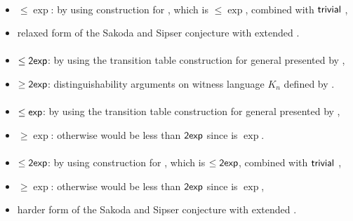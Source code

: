 \paragraph{\TNFA{}\tto\OMODLA}
\begin{itemize}
	\item $\le\exp$: by using construction for \hyperref[cost:2NFAto1DFA]{\TNFA{}\tto\ODFA}, which is $\le\exp$, combined with $\mathsf{trivial}$ \ODFA{}\tto\OMODLA,
	\item relaxed form of the Sakoda and Sipser conjecture with extended \TDFA.
\end{itemize}
\paragraph{\OMOLA{}\tto\ODFA}\label{cost:OM1LAto1DFA}
\begin{itemize}
	\item $\le\mathsf{2exp}$: by using the transition table construction for general \OLA presented by ,
	\item $\ge\mathsf{2exp}$: distinguishability arguments on witness language $K_n$ defined by .
\end{itemize}
\paragraph{\OMOLA{}\tto\ONFA}\label{cost:OM1LAto1NFA}
\begin{itemize}
	\item $\le\mathsf{exp}$: by using the transition table construction for general \OLA presented by ,
	\item $\ge\exp$: otherwise \hyperref[cost:OM1LAto1DFA]{\OMOLA{}\tto\ODFA} would be less than $\mathsf{2exp}$ since \hyperref[cost:1NFAto1DFA]{\ONFA{}\tto\ODFA} is $\exp$.
\end{itemize}
\paragraph{\OMOLA{}\tto\TDFA}
\begin{itemize}
	\item $\le\mathsf{2exp}$: by using construction for \hyperref[cost:OM1LAto1DFA]{\OMOLA{}\tto\ODFA}, which is $\le\mathsf{2exp}$, combined with $\mathsf{trivial}$ \ODFA{}\tto\TDFA,
	\item $\ge\exp$: otherwise \hyperref[cost:OM1LAto1DFA]{\OMOLA{}\tto\ODFA} would be less than $\mathsf{2exp}$ since \hyperref[cost:2DFAto1DFA]{\TDFA{}\tto\ODFA} is $\exp$,
	\item harder form of the Sakoda and Sipser conjecture with extended \TNFA.
\end{itemize}
